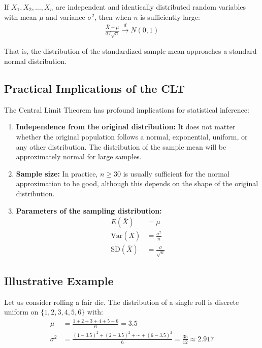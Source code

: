 \begin{theorem}
	If $X_1, X_2, \ldots, X_n$ are independent and identically distributed random variables with mean $\mu$ and variance $\sigma^2$, then when $n$ is sufficiently large:
	\begin{align}
		\frac{\bar{X} - \mu}{\sigma/\sqrt{n}} \xrightarrow{d} N(0,1)
	\end{align}
	
	That is, the distribution of the standardized sample mean approaches a standard normal distribution.
\end{theorem}

\subsection{Practical Implications of the CLT}

The Central Limit Theorem has profound implications for statistical inference:

\begin{enumerate}
	\item \textbf{Independence from the original distribution:} It does not matter whether the original population follows a normal, exponential, uniform, or any other distribution. The distribution of the sample mean will be approximately normal for large samples.
	
	\item \textbf{Sample size:} In practice, $n \geq 30$ is usually sufficient for the normal approximation to be good, although this depends on the shape of the original distribution.
	
	\item \textbf{Parameters of the sampling distribution:}
	\begin{align}
		E(\bar{X}) &= \mu \\
		\text{Var}(\bar{X}) &= \frac{\sigma^2}{n} \\
		\text{SD}(\bar{X}) &= \frac{\sigma}{\sqrt{n}}
	\end{align}
\end{enumerate}

\subsection{Illustrative Example}

Let us consider rolling a fair die. The distribution of a single roll is discrete uniform on $\{1, 2, 3, 4, 5, 6\}$ with:
\begin{align}
	\mu &= \frac{1+2+3+4+5+6}{6} = 3.5 \\
	\sigma^2 &= \frac{(1-3.5)^2 + (2-3.5)^2 + \cdots + (6-3.5)^2}{6} = \frac{35}{12} \approx 2.917
\end{align}

